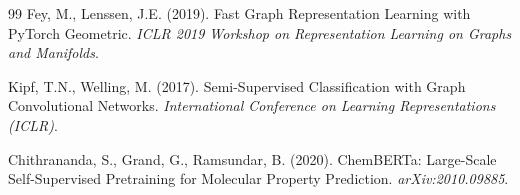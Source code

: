 \documentclass[10pt, letterpaper]{article}
\begin{document}
\begin{thebibliography}{99}
Fey, M., Lenssen, J.E. (2019).
Fast Graph Representation Learning with PyTorch Geometric.
\textit{ICLR 2019 Workshop on Representation Learning on Graphs and Manifolds}.

Kipf, T.N., Welling, M. (2017).
Semi-Supervised Classification with Graph Convolutional Networks.
\textit{International Conference on Learning Representations (ICLR)}.

Chithrananda, S., Grand, G., Ramsundar, B. (2020).
ChemBERTa: Large-Scale Self-Supervised Pretraining for Molecular Property Prediction.
\textit{arXiv:2010.09885}.

\end{thebibliography}
\end{document}
